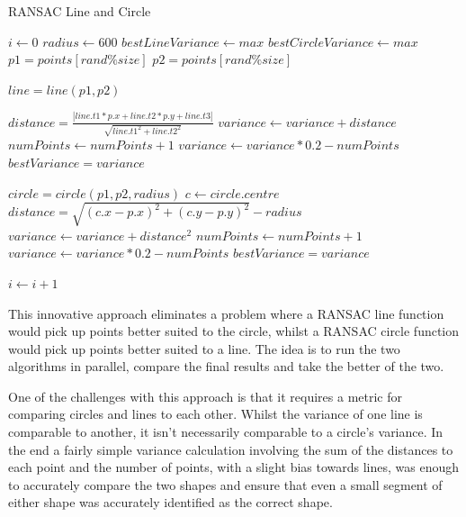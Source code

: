 \documentclass[runningheads,a4paper]{llncs}
\begin{document}
\begin{algorithm} [H] 
\caption{RANSAC Line and Circle}
\begin{algorithmic} \label{alg:ransac}

\STATE $i \leftarrow 0$
\STATE $radius \leftarrow 600$
\STATE $bestLineVariance \leftarrow max$
\STATE $bestCircleVariance \leftarrow max$
	\STATE $p1 = points[rand\%size]$
	\STATE $p2 = points[rand\%size]$
	
	\STATE $line = line(p1, p2)$
		
		\STATE $distance = \frac{|line.t1*p.x + line.t2*p.y + line.t3|}{\sqrt{line.t1^2 + line.t2^2}}$
			\STATE $variance \leftarrow variance + distance$
			\STATE $numPoints \leftarrow numPoints + 1$
		\ENDIF
	\ENDFOR
	\STATE $variance \leftarrow variance * 0.2 - numPoints$
		\STATE $bestVariance = variance$
	\ENDIF
	
	\STATE $circle = circle(p1, p2, radius)$
		\STATE $c \leftarrow circle.centre$
		\STATE $distance = \sqrt{(c.x - p.x)^2 + (c.y - p.y)^2} - radius$
			\STATE $variance \leftarrow variance + distance^2$
			\STATE $numPoints \leftarrow numPoints + 1$
		\ENDIF
	\ENDFOR
	\STATE $variance \leftarrow variance * 0.2 - numPoints$
		\STATE $bestVariance = variance$
	\ENDIF
	
	\STATE $i \leftarrow i + 1$
\ENDWHILE

\end{algorithmic}
\end{algorithm}


This innovative approach eliminates a problem where a RANSAC line function would pick up points better suited to the circle, whilst a RANSAC circle function would pick up points better suited to a line. The idea is to run the two algorithms in parallel, compare the final results and take the better of the two.

One of the challenges with this approach is that it requires a metric for comparing circles and lines to each other. Whilst the variance of one line is comparable to another, it isn't necessarily comparable to a circle's variance. In the end a fairly simple variance calculation involving the sum of the distances to each point and the number of points, with a slight bias towards lines, was enough to accurately compare the two shapes and ensure that even a small segment of either shape was accurately identified as the correct shape.
\end{document}
